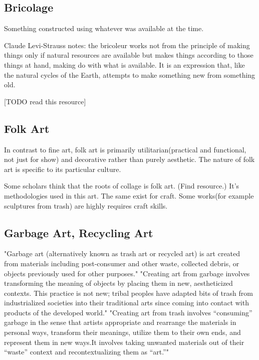 \subsection{Bricolage}
Something constructed using whatever was available at the time.

Claude Levi-Strauss notes: the bricoleur works not from the principle of making things only if natural resources are available but makes things according to those things at hand, making do with what is available. It is an expression that, like the natural cycles of the Earth, attempts to make something new from something old. \cite{levi1966savage}

[TODO read this resource]\cite{strasser1999waste}

\subsection{Folk Art}
In contrast to fine art, folk art is primarily utilitarian(practical and functional, not just for show) and decorative rather than purely aesthetic. The nature of folk art is specific to its particular culture.

Some scholars think that the roots of collage is folk art. (Find resource.) It's methodologies used in this art. The same exist for craft. Some works(for example sculptures from trash) are highly requires craft skills.

\subsection{Garbage Art, Recycling Art}
"Garbage art (alternatively known as trash art or recycled art) is art created from materials including post-consumer and other waste, collected debris, or objects previously used for other purposes." "Creating art from garbage involves transforming the meaning of objects by placing them in new, aestheticized contexts. This practice is not new; tribal peoples have adapted bits of trash from industrialized societies into their traditional arts since coming into contact with products of the developed world." "Creating art from trash involves “consuming” garbage in the sense that artists appropriate and rearrange the materials in personal ways, transform their meanings, utilize them to their own ends, and represent them in new ways.It involves taking unwanted materials out of their “waste” context and recontextualizing them as “art.”" \cite{tauxe2012encyclopedia}

